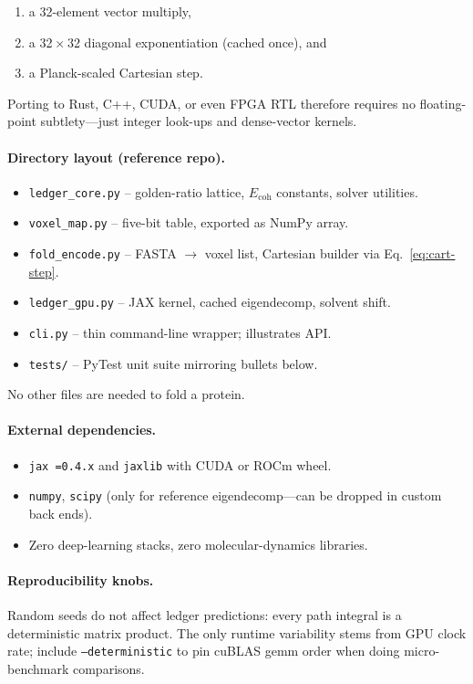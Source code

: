 \documentclass[11pt]{article}
\newcommand{\Eoh}{E_{\mathrm{coh}}}          %
\begin{document}
\begin{enumerate}\setlength\itemsep{2pt}
\item a 32-element vector multiply,
\item a 32 × 32 diagonal exponentiation (cached once), and
\item a Planck-scaled Cartesian step.
\end{enumerate}

Porting to Rust, C++, CUDA, or even FPGA RTL therefore requires no
floating-point subtlety—just integer look-ups and dense-vector kernels.

\paragraph{Directory layout (reference repo).}

\begin{itemize}\setlength\itemsep{2pt}
\item \texttt{ledger\_core.py} – golden-ratio lattice, $\Eoh$ constants,
      solver utilities.
\item \texttt{voxel\_map.py} – five-bit table, exported as NumPy array.
\item \texttt{fold\_encode.py} – FASTA $\to$ voxel list, Cartesian
      builder via Eq.~\eqref{eq:cart-step}.
\item \texttt{ledger\_gpu.py} – JAX kernel, cached eigendecomp, solvent
      shift.
\item \texttt{cli.py} – thin command-line wrapper; illustrates API.
\item \texttt{tests/} – PyTest unit suite mirroring bullets below.
\end{itemize}

No other files are needed to fold a protein.

\paragraph{External dependencies.}
\begin{itemize}\setlength\itemsep{2pt}
\item \texttt{jax~=0.4.x} and \texttt{jaxlib} with CUDA or ROCm wheel.
\item \texttt{numpy}, \texttt{scipy} (only for reference eigendecomp—can
      be dropped in custom back ends).
\item Zero deep-learning stacks, zero molecular-dynamics libraries.
\end{itemize}

\paragraph{Reproducibility knobs.}
Random seeds do not affect ledger predictions: every path integral is a
deterministic matrix product.  The only runtime variability stems from
GPU clock rate; include \texttt{--deterministic} to pin cuBLAS gemm order
when doing micro-benchmark comparisons.
\end{document}
